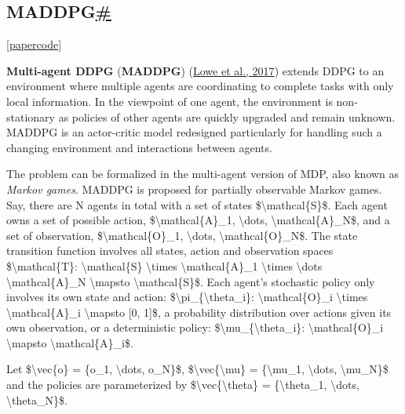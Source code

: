 \subsection{\texorpdfstring{MADDPG\hyperref[maddpg]{\#}}{MADDPG\#}}\label{maddpg}

{[}\href{https://arxiv.org/pdf/1706.02275.pdf}{paper}\textbar{}\href{https://github.com/openai/maddpg}{code}{]}

\textbf{Multi-agent DDPG} (\textbf{MADDPG}) (\href{https://arxiv.org/pdf/1706.02275.pdf}{Lowe et al., 2017}) extends DDPG to an environment where multiple agents are coordinating to complete tasks with only local information. In the viewpoint of one agent, the environment is non-stationary as policies of other agents are quickly upgraded and remain unknown. MADDPG is an actor-critic model redesigned particularly for handling such a changing environment and interactions between agents.

The problem can be formalized in the multi-agent version of MDP, also known as \emph{Markov games}. MADDPG is proposed for partially observable Markov games. Say, there are N agents in total with a set of states \$\textbackslash mathcal\{S\}\$. Each agent owns a set of possible action, \$\textbackslash mathcal\{A\}\_1, \textbackslash dots, \textbackslash mathcal\{A\}\_N\$, and a set of observation, \$\textbackslash mathcal\{O\}\_1, \textbackslash dots, \textbackslash mathcal\{O\}\_N\$. The state transition function involves all states, action and observation spaces \$\textbackslash mathcal\{T\}: \textbackslash mathcal\{S\} \textbackslash times \textbackslash mathcal\{A\}\_1 \textbackslash times \textbackslash dots \textbackslash mathcal\{A\}\_N \textbackslash mapsto \textbackslash mathcal\{S\}\$. Each agent's stochastic policy only involves its own state and action: \$\textbackslash pi\_\{\textbackslash theta\_i\}: \textbackslash mathcal\{O\}\_i \textbackslash times \textbackslash mathcal\{A\}\_i \textbackslash mapsto {[}0, 1{]}\$, a probability distribution over actions given its own observation, or a deterministic policy: \$\textbackslash mu\_\{\textbackslash theta\_i\}: \textbackslash mathcal\{O\}\_i \textbackslash mapsto \textbackslash mathcal\{A\}\_i\$.

Let \$\textbackslash vec\{o\} = \{o\_1, \textbackslash dots, o\_N\}\$, \$\textbackslash vec\{\textbackslash mu\} = \{\textbackslash mu\_1, \textbackslash dots, \textbackslash mu\_N\}\$ and the policies are parameterized by \$\textbackslash vec\{\textbackslash theta\} = \{\textbackslash theta\_1, \textbackslash dots, \textbackslash theta\_N\}\$.

